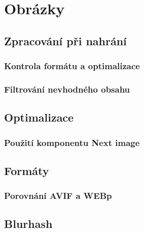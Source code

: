 \chapter{Obrázky}
\section{Zpracování při nahrání}
\subsection{Kontrola formátu a optimalizace}
\subsection{Filtrování nevhodného obsahu}
\section{Optimalizace}
\subsection{Použití komponentu Next image}
\section{Formáty}
\subsection{Porovnání AVIF a WEBp}
\section{Blurhash}